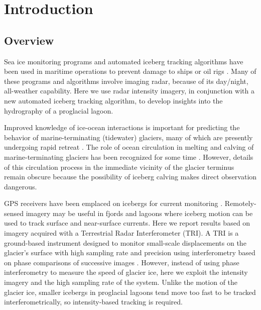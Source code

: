 \section{Introduction}
\subsection{Overview}
Sea ice monitoring programs and automated iceberg tracking algorithms have been used in maritime operations to prevent damage to ships or oil rigs \citep{smith1983influence}.   Many of these programs and algorithms involve imaging radar, because of its day/night, all-weather capability. Here we use radar intensity imagery, in conjunction with a new automated iceberg tracking algorithm, to develop insights into the hydrography of a proglacial lagoon.

Improved knowledge of ice-ocean interactions is important for predicting the behavior of marine-terminating (tidewater) glaciers, many of which are presently undergoing rapid retreat \citep{straneo2013challenges}. The role of ocean circulation in melting and calving of marine-terminating glaciers has been recognized for some time \citep{motyka2003submarine,holland2008acceleration,straneo2010rapid}.  However, details of this circulation process in the immediate vicinity of the glacier terminus remain obscure because the possibility of iceberg calving makes direct observation dangerous.   

GPS receivers have been emplaced on icebergs for current monitoring \citep{sutherland2014quantifying}. Remotely-sensed imagery may be useful in fjords and lagoons where iceberg motion can be used to track surface and near-surface currents.  Here we report results based on imagery acquired with a Terrestrial Radar Interferometer (TRI). A TRI is a ground-based instrument designed to monitor small-scale displacements on the glacier's surface with high sampling rate and precision using interferometry based on phase comparisons of successive images \citep{voytenko2014}.  However, instead of using phase interferometry to measure the speed of glacier ice, here we exploit the intensity imagery and the high sampling rate of the system. Unlike the motion of the glacier ice, smaller icebergs in proglacial lagoons tend move too fast to be tracked interferometrically, so intensity-based tracking is required. 


